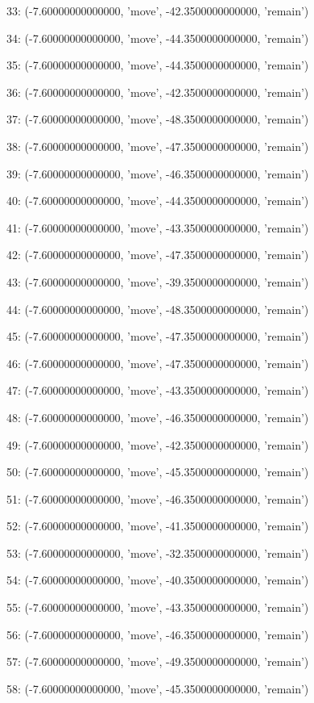33: (-7.60000000000000, 'move', -42.3500000000000, 'remain')


34: (-7.60000000000000, 'move', -44.3500000000000, 'remain')


35: (-7.60000000000000, 'move', -44.3500000000000, 'remain')


36: (-7.60000000000000, 'move', -42.3500000000000, 'remain')


37: (-7.60000000000000, 'move', -48.3500000000000, 'remain')


38: (-7.60000000000000, 'move', -47.3500000000000, 'remain')


39: (-7.60000000000000, 'move', -46.3500000000000, 'remain')


40: (-7.60000000000000, 'move', -44.3500000000000, 'remain')


41: (-7.60000000000000, 'move', -43.3500000000000, 'remain')


42: (-7.60000000000000, 'move', -47.3500000000000, 'remain')


43: (-7.60000000000000, 'move', -39.3500000000000, 'remain')


44: (-7.60000000000000, 'move', -48.3500000000000, 'remain')


45: (-7.60000000000000, 'move', -47.3500000000000, 'remain')


46: (-7.60000000000000, 'move', -47.3500000000000, 'remain')


47: (-7.60000000000000, 'move', -43.3500000000000, 'remain')


48: (-7.60000000000000, 'move', -46.3500000000000, 'remain')


49: (-7.60000000000000, 'move', -42.3500000000000, 'remain')


50: (-7.60000000000000, 'move', -45.3500000000000, 'remain')


51: (-7.60000000000000, 'move', -46.3500000000000, 'remain')


52: (-7.60000000000000, 'move', -41.3500000000000, 'remain')


53: (-7.60000000000000, 'move', -32.3500000000000, 'remain')


54: (-7.60000000000000, 'move', -40.3500000000000, 'remain')


55: (-7.60000000000000, 'move', -43.3500000000000, 'remain')


56: (-7.60000000000000, 'move', -46.3500000000000, 'remain')


57: (-7.60000000000000, 'move', -49.3500000000000, 'remain')


58: (-7.60000000000000, 'move', -45.3500000000000, 'remain')


